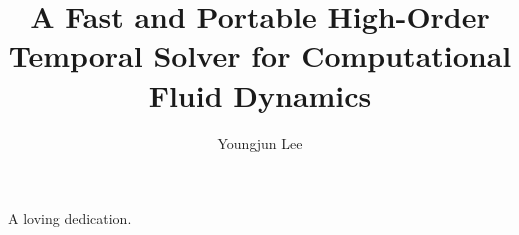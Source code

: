 




\title{A Fast and Portable High-Order Temporal Solver for Computational Fluid Dynamics}
\author{Youngjun Lee}
\deanlinethree{}

\begin{frontmatter}
\maketitle

\copyrightpage

\tableofcontents

\listoffigures

\listoftables

\begin{abstract}

\end{abstract}

\begin{dedication}
\vspace*{\fill}
\begin{center}
A loving dedication.
\end{center}
\vspace*{\fill}
\end{dedication}

\begin{acknowledgements}

\end{acknowledgements}

\end{frontmatter}















\nocite{*}

\singlespacing

\doublespacing



